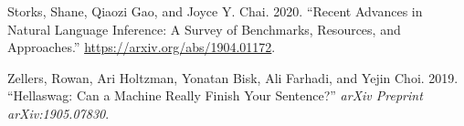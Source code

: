 \documentclass[
]{article}
\newlength{\cslhangindent}
\newenvironment{CSLReferences}[2] %
 {\begin{list}{}{%
  \setlength{\itemindent}{0pt}
  \setlength{\leftmargin}{0pt}
  \setlength{\parsep}{0pt}
  \ifodd #1
   \setlength{\leftmargin}{\cslhangindent}
   \setlength{\itemindent}{-1\cslhangindent}
  \fi
  \setlength{\itemsep}{#2\baselineskip}}}
 {\end{list}}
\begin{document}
\begin{CSLReferences}{1}{0}
Storks, Shane, Qiaozi Gao, and Joyce Y. Chai. 2020. {``Recent Advances
in Natural Language Inference: A Survey of Benchmarks, Resources, and
Approaches.''} \url{https://arxiv.org/abs/1904.01172}.

Zellers, Rowan, Ari Holtzman, Yonatan Bisk, Ali Farhadi, and Yejin Choi.
2019. {``Hellaswag: Can a Machine Really Finish Your Sentence?''}
\emph{arXiv Preprint arXiv:1905.07830}.

\end{CSLReferences}
\end{document}
